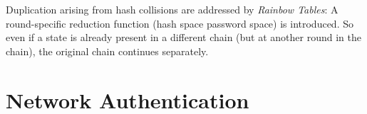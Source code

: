 Duplication arising from hash collisions are addressed by \emph{Rainbow Tables}:
A round-specific reduction function (hash space \textrightarrow password space)
is introduced. So even if a state is already present in a different chain (but
at another round in the chain), the original chain continues separately.

\section{Network Authentication}
